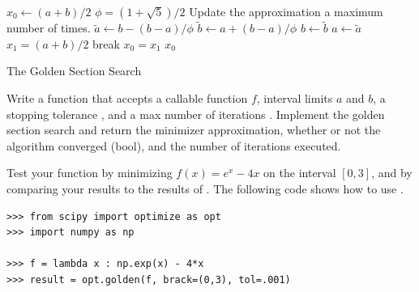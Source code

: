 \begin{algorithm}[H]
\begin{algorithmic}[1]
   \State $x_0 \gets (a + b)/2$
   \State $\phi = (1+\sqrt{5})/2$
       \Comment Update the approximation a maximum number of times.
        \State $\tilde{a} \gets b - (b - a)/\phi$
        \State $\tilde{b} \gets a + (b-a)/\phi$
              \State $b \gets \tilde{b}$
         \Else{}
               \State $a \gets \tilde{a}$
                \EndIf
        \State $x_1 = (a + b)/2$
              \State break
	   \EndIf
        \State $x_0 = x_1$
   \EndFor
   \Return $x_0$
\EndProcedure
\end{algorithmic}
\caption{The Golden Section Search}
\label{Alg:Golden-Section-Search}
\end{algorithm}

\begin{problem}
Write a function that accepts a callable function $f$, interval limits $a$ and $b$, a stopping tolerance , and a max number of iterations .
Implement the golden section search and return the minimizer approximation, whether or not the algorithm converged (bool), and the number of iterations executed.

Test your function by minimizing $f(x) = e^x - 4x$ on the interval $[0, 3]$, and by comparing your results to the results of .
The following code shows how to use .
 
\begin{lstlisting}
>>> from scipy import optimize as opt
>>> import numpy as np

>>> f = lambda x : np.exp(x) - 4*x
>>> result = opt.golden(f, brack=(0,3), tol=.001)
\end{lstlisting}
\label{prob:golden-section-search}
\end{problem}

